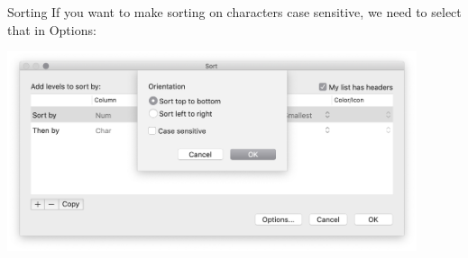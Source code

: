 \documentclass[xcolor=svgnames]{beamer}
\begin{document}
\begin{frame}{Sorting}
If you want to make sorting on characters case sensitive, we need to select that in Options:
 \begin{center}
\includegraphics[width=0.9\textwidth]{img/caseSensitive.png}
 \end{center}
\end{frame}
\end{document}
